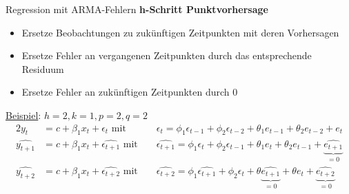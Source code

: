 \begin{frame}{Regression mit ARMA-Fehlern}
	\textbf{h-Schritt Punktvorhersage}\\
	\begin{itemize}
		\item Ersetze Beobachtungen zu zukünftigen Zeitpunkten mit deren Vorhersagen
		\item Ersetze Fehler an vergangenen Zeitpunkten durch das entsprechende Residuum
		\item Ersetze Fehler an zukünftigen Zeitpunkten durch 0
	\end{itemize}
	\underline{Beispiel}: $h=2, k=1, p=2, q=2$
	\begin{alignat*}{2}
		y_t &= c + \beta_1 x_{t} + \epsilon_t \text{ mit }&&\epsilon_{t} = \phi_1\epsilon_{t-1} + \phi_2\epsilon_{t-2} + \theta_1e_{t-1} + \theta_2e_{t-2} + e_t \\		
		\widehat{y_{t+1}} &= c + \beta_1 x_{t} + \widehat{\epsilon_{t+1}} \text{ mit }&& \widehat{\epsilon_{t+1}} = \phi_1\epsilon_{t} + \phi_2\epsilon_{t-1} + \theta_1e_{t} + \theta_2e_{t-1} + \underbrace{\widehat{e_{t+1}}}_{=0}\\
		\widehat{y_{t+2}} &= c + \beta_1 x_{t} + \widehat{\epsilon_{t+2}}\text{ mit }&&\widehat{\epsilon_{t+2}} = \phi_1\widehat{\epsilon_{t+1}} + \phi_2\epsilon_t + \theta \underbrace{\widehat{e_{t+1}}}_{=0} + \theta e_t + \underbrace{\widehat{e_{t+2}}}_{=0}
	\end{alignat*}
\end{frame}

	


